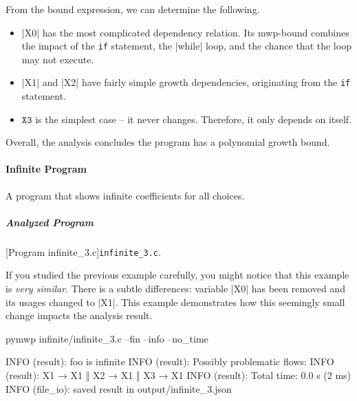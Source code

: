 From the bound expression, we can determine the following.

\begin{itemize}
\item \pr|X0| has the most complicated dependency relation.
Its mwp-bound combines the impact of the \texttt{if} statement, the \pr|while| loop, and the chance that the loop may not execute.

\item \pr|X1| and \pr|X2| have fairly simple growth dependencies, originating from the \texttt{if} statement.

\item \(\texttt{X3}\) is the simplest case -- it never changes.
Therefore, it only depends on itself.
\end{itemize}

Overall, the analysis concludes the program has a polynomial growth bound.

\paragraph{Infinite Program}\label{inf-prog}
A program that shows infinite coefficients for all choices.

\subparagraph*{Analyzed Program}

\begin{center}
\begin{minipage}{\textwidth}
\captionsetup{type=lstlisting}
[Program infinite\_3.c]{\texttt{infinite\_3.c}.}
\label{lst:inifnite3}
\end{minipage}
\end{center}

If you studied the previous example carefully, you might notice that this example is \emph{very similar}.
There is a subtle differences: variable \pr|X0| has been removed and its usages changed to \pr|X1|.
This example demonstrates how this seemingly small change impacts the analysis result.

\begin{center}
\begin{minipage}{\textwidth}
\begin{cmdlisting}[label={lst:ex4-run-cmd}]
pymwp infinite/infinite_3.c --fin --info --no_time
\end{cmdlisting}
\end{minipage}
\end{center}

\begin{center}
\begin{minipage}{\textwidth}
\begin{outlisting}[label={lst:ex4-output}]
INFO (result): foo is infinite
INFO (result): Possibly problematic flows:
INFO (result): X1 → X1 ‖ X2 → X1 ‖ X3 → X1
INFO (result): Total time: 0.0 s (2 ms)
INFO (file_io): saved result in output/infinite_3.json
\end{outlisting}
\end{minipage}
\end{center}

